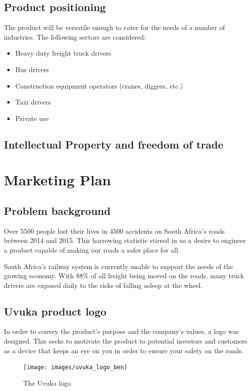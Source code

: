 \section{Product positioning}
The product will be versatile enough to cater for the needs of a number of industries. The following sectors are considered:
\begin{itemize}
\item Heavy duty freight truck drivers
\item Bus drivers
\item Construction equipment operators (cranes, diggers, etc.)
\item Taxi drivers
\item Private use
\end{itemize}

\section{Intellectual Property and freedom of trade}

\newpage
\chapter{Marketing Plan}
\section{Problem background}
Over 5500 people lost their lives in 4500 accidents on South Africa's roads between 2014 and 2015. This harrowing statistic stirred in us a desire to engineer a product capable of making our roads a safer place for all\cite{EWNRoadDeaths}.

South Africa's railway system is currently unable to support the needs of the growing economy. With 88\% of all freight being moved on the roads\cite{BDlive_freight}, many truck drivers are exposed daily to the risks of falling asleep at the wheel\cite{ArriveAliveDriverTiredness}.

\section{Uvuka product logo}
In order to convey the product's purpose and the company's values, a logo was designed. This seeks to motivate the product to potential investors and customers as a device that keeps an eye on you in order to ensure your safety on the roads.

\begin{figure}[H]
\centering
\texttt{[image: images/uvuka\_logo\_ben]}
\vskip10pt
\caption[The caption that appears in the list of figures]{The Uvuka logo}
\label{fig:uvuka_logo}
\end{figure}

